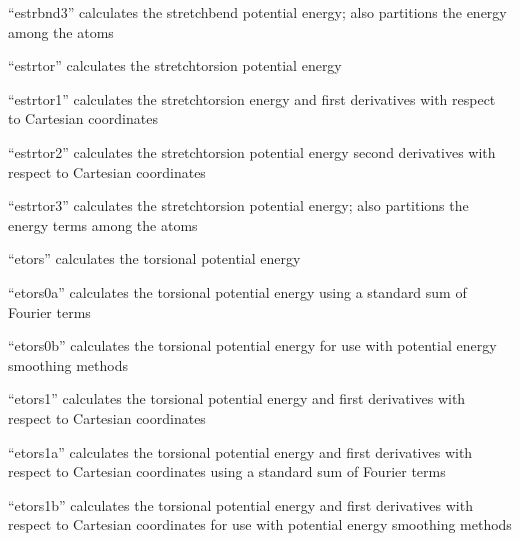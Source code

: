 \documentclass[letterpaper,11pt,english]{sphinxmanual}
\begin{document}

“estrbnd3” calculates the stretch\sphinxhyphen{}bend potential energy;
also partitions the energy among the atoms


“estrtor” calculates the stretch\sphinxhyphen{}torsion potential energy


“estrtor1” calculates the stretch\sphinxhyphen{}torsion energy and first
derivatives with respect to Cartesian coordinates


“estrtor2” calculates the stretch\sphinxhyphen{}torsion potential energy
second derivatives with respect to Cartesian coordinates


“estrtor3” calculates the stretch\sphinxhyphen{}torsion potential energy;
also partitions the energy terms among the atoms


“etors” calculates the torsional potential energy


“etors0a” calculates the torsional potential energy
using a standard sum of Fourier terms


“etors0b” calculates the torsional potential energy
for use with potential energy smoothing methods


“etors1” calculates the torsional potential energy and first
derivatives with respect to Cartesian coordinates


“etors1a” calculates the torsional potential energy and first
derivatives with respect to Cartesian coordinates using a
standard sum of Fourier terms


“etors1b” calculates the torsional potential energy and first
derivatives with respect to Cartesian coordinates for use with
potential energy smoothing methods

\end{document}
